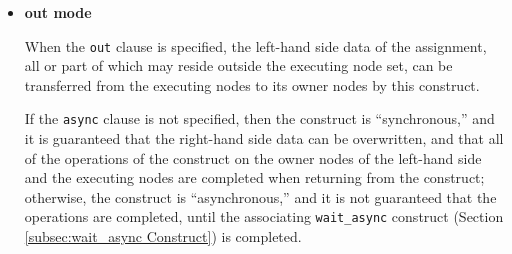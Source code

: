 \begin{itemize}
 \item {\bf out mode}

       When the {\tt out} clause is specified, the left-hand side data of the
       assignment, all or part of which may reside outside the 
       executing node set, can be transferred from the executing nodes
       to its owner nodes by this construct.

       If the {\tt async} clause is not specified, then the construct is
       ``synchronous,'' and it is guaranteed that the right-hand side data
       can be overwritten, and that all of the operations of the construct on
       the owner nodes of the left-hand side and the executing nodes are
       completed when returning from the construct; otherwise, the
       construct is ``asynchronous,'' and it is not guaranteed that the
       operations are completed, until the associating {\tt wait\_async}
       construct (Section \ref{subsec:wait_async Construct}) is completed.

\end{itemize}


%



